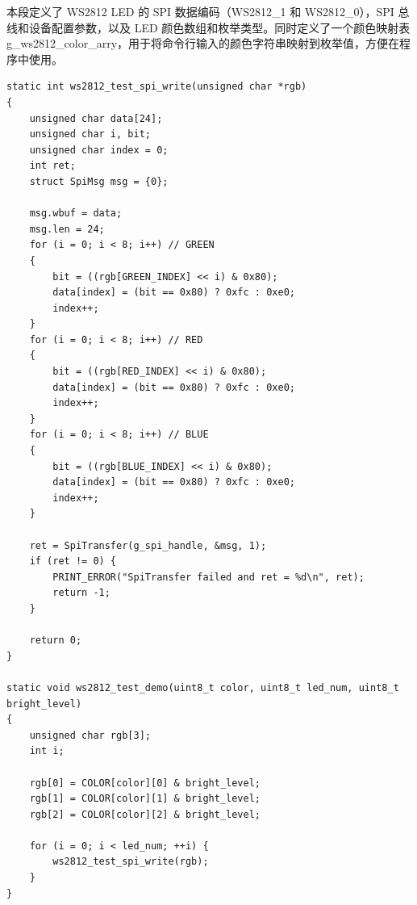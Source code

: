 本段定义了 WS2812 LED 的 SPI 数据编码（WS2812_1 和 WS2812_0），SPI 总线和设备配置参数，以及 LED 颜色数组和枚举类型。同时定义了一个颜色映射表 g_ws2812_color_arry，用于将命令行输入的颜色字符串映射到枚举值，方便在程序中使用。
\begin{lstlisting}
static int ws2812_test_spi_write(unsigned char *rgb)
{
    unsigned char data[24];
    unsigned char i, bit;
    unsigned char index = 0;
    int ret;
    struct SpiMsg msg = {0};

    msg.wbuf = data;
    msg.len = 24;
    for (i = 0; i < 8; i++) // GREEN
    {
        bit = ((rgb[GREEN_INDEX] << i) & 0x80);
        data[index] = (bit == 0x80) ? 0xfc : 0xe0;
        index++;
    }
    for (i = 0; i < 8; i++) // RED
    {
        bit = ((rgb[RED_INDEX] << i) & 0x80);
        data[index] = (bit == 0x80) ? 0xfc : 0xe0;
        index++;
    }
    for (i = 0; i < 8; i++) // BLUE
    {
        bit = ((rgb[BLUE_INDEX] << i) & 0x80);
        data[index] = (bit == 0x80) ? 0xfc : 0xe0;
        index++;
    }

    ret = SpiTransfer(g_spi_handle, &msg, 1);
    if (ret != 0) {
        PRINT_ERROR("SpiTransfer failed and ret = %d\n", ret);
        return -1;
    }

    return 0;
}

static void ws2812_test_demo(uint8_t color, uint8_t led_num, uint8_t bright_level)
{
    unsigned char rgb[3];
    int i;

    rgb[0] = COLOR[color][0] & bright_level;
    rgb[1] = COLOR[color][1] & bright_level;
    rgb[2] = COLOR[color][2] & bright_level;

    for (i = 0; i < led_num; ++i) {
        ws2812_test_spi_write(rgb);
    }
}
\end{lstlisting}


